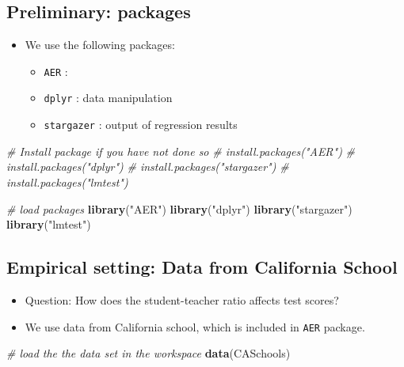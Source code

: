 \documentclass[]{book}
\newenvironment{Shaded}{\begin{snugshade}}{\end{snugshade}}
\newcommand{\CommentTok}[1]{\textcolor[rgb]{0.56,0.35,0.01}{\textit{#1}}}
\newcommand{\KeywordTok}[1]{\textcolor[rgb]{0.13,0.29,0.53}{\textbf{#1}}}
\newcommand{\NormalTok}[1]{#1}
\newcommand{\StringTok}[1]{\textcolor[rgb]{0.31,0.60,0.02}{#1}}
\providecommand{\tightlist}{%
  \setlength{\itemsep}{0pt}\setlength{\parskip}{0pt}}
\begin{document}
\hypertarget{preliminary-packages}{%
\subsection{Preliminary: packages}\label{preliminary-packages}}

\begin{itemize}
\tightlist
\item
  We use the following packages:

  \begin{itemize}
  \tightlist
  \item
    \texttt{AER} :
  \item
    \texttt{dplyr} : data manipulation
  \item
    \texttt{stargazer} : output of regression results
  \end{itemize}
\end{itemize}

\begin{Shaded}
\begin{Highlighting}[]
\CommentTok{# Install package if you have not done so }
\CommentTok{# install.packages("AER")}
\CommentTok{# install.packages("dplyr")}
\CommentTok{# install.packages("stargazer")}
\CommentTok{# install.packages("lmtest")}

\CommentTok{# load packages}
\KeywordTok{library}\NormalTok{(}\StringTok{"AER"}\NormalTok{)}
\KeywordTok{library}\NormalTok{(}\StringTok{"dplyr"}\NormalTok{)}
\KeywordTok{library}\NormalTok{(}\StringTok{"stargazer"}\NormalTok{)}
\KeywordTok{library}\NormalTok{(}\StringTok{"lmtest"}\NormalTok{)}
\end{Highlighting}
\end{Shaded}

\hypertarget{empirical-setting-data-from-california-school}{%
\subsection{Empirical setting: Data from California School}\label{empirical-setting-data-from-california-school}}

\begin{itemize}
\tightlist
\item
  Question: How does the student-teacher ratio affects test scores?
\item
  We use data from California school, which is included in \texttt{AER} package.
\end{itemize}

\begin{Shaded}
\begin{Highlighting}[]
\CommentTok{# load the the data set in the workspace}
\KeywordTok{data}\NormalTok{(CASchools)}
\end{Highlighting}
\end{Shaded}
\end{document}
